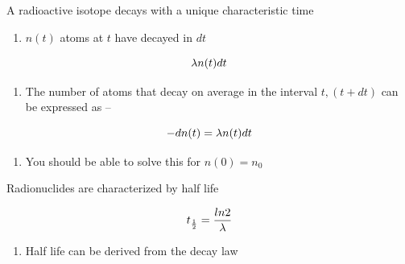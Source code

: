 \documentclass[aspectratio=1610,pdftex,dvipsnames,compress,xcolor={dvipsnames}]{beamer}
\begin{document}
\begin{frame}{A radioactive isotope decays with a unique characteristic time}
    \begin{enumerate}[series=outerlist,topsep=0pt,itemsep=21pt,leftmargin=*,label=(\arabic*)]
        \item[]$n(t)$ atoms at $t$ have decayed in $dt$
    \end{enumerate}

    \vspace*{\fill}

    \begin{equation}
        \LARGE
        \lambda n(t) dt
    \end{equation}

    \vspace*{\fill}

    \begin{enumerate}[series=outerlist,topsep=0pt,itemsep=21pt,leftmargin=*,label=(\arabic*)]
        \item[]The number of atoms that decay on average in the interval $t,(t+dt)$ can be expressed as --
    \end{enumerate}

    \vspace*{\fill}

    \begin{equation}
        \LARGE
        -dn(t)=\lambda n(t) dt
    \end{equation}

    \vspace*{\fill}

    \begin{enumerate}[series=outerlist,topsep=0pt,itemsep=21pt,leftmargin=*,label=(\arabic*)]
        \item[]You should be able to solve this for $n(0)=n_0$
    \end{enumerate}
\end{frame}


\begin{frame}{Radionuclides are characterized by half life}

    \begin{equation}
        \LARGE
        t_{\frac{1}{2}}=\frac{ln 2}{\lambda}
    \end{equation}

    \vspace*{\fill}

    \begin{enumerate}[series=outerlist,topsep=0pt,itemsep=21pt,leftmargin=*,label=(\arabic*)]
        \item[]Half life can be derived from the decay law
    \end{enumerate}
\end{frame}
\end{document}

